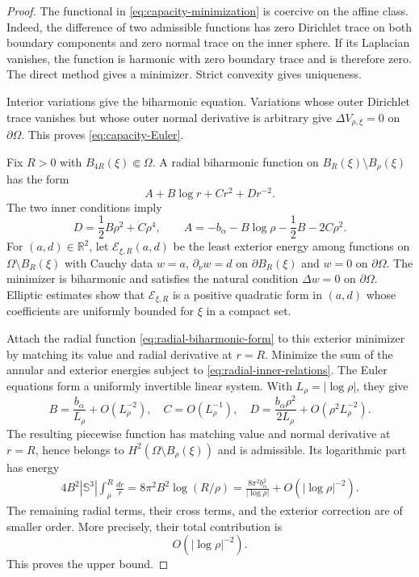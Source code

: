 \documentclass[11pt]{article}
\numberwithin{equation}{section}
\begin{document}
\begin{proof}
The functional in \eqref{eq:capacity-minimization} is coercive on
the affine class. Indeed, the difference of two admissible functions
has zero Dirichlet trace on both boundary components and zero normal
trace on the inner sphere. If its Laplacian vanishes, the function is
harmonic with zero boundary trace and is therefore zero. The direct
method gives a minimizer. Strict convexity gives uniqueness.

Interior variations give the biharmonic equation. Variations whose
outer Dirichlet trace vanishes but whose outer normal derivative is
arbitrary give $\Delta V_{\rho,\xi}=0$ on $\partial\Omega$. This proves
\eqref{eq:capacity-Euler}.

Fix $R>0$ with $B_{4R}(\xi)\Subset\Omega$. A radial biharmonic
function on $B_R(\xi)\setminus B_\rho(\xi)$ has the form
\begin{equation}\label{eq:radial-biharmonic-form}
A+B\log r+Cr^2+Dr^{-2}.
\end{equation}
The two inner conditions imply
\begin{equation}\label{eq:radial-inner-relations}
D=\frac12B\rho^2+C\rho^4,
\qquad
A=-b_\alpha-B\log\rho-\frac12B-2C\rho^2.
\end{equation}
For $(a,d)\in\mathbb R^2$, let
$\mathcal E_{\xi,R}(a,d)$ be the least exterior energy among
functions on $\Omega\setminus B_R(\xi)$ with Cauchy data
$w=a$, $\partial_\nu w=d$ on $\partial B_R(\xi)$ and
$w=0$ on $\partial\Omega$. The minimizer is biharmonic and satisfies
the natural condition $\Delta w=0$ on $\partial\Omega$.
Elliptic estimates show that
$\mathcal E_{\xi,R}$ is a positive quadratic form in $(a,d)$ whose
coefficients are uniformly bounded for $\xi$ in a compact set.

Attach the radial function \eqref{eq:radial-biharmonic-form} to this
exterior minimizer by matching its value and radial derivative at
$r=R$. Minimize the sum of the annular and exterior energies subject
to \eqref{eq:radial-inner-relations}. The Euler equations form a
uniformly invertible linear system. With
$L_\rho=|\log\rho|$, they give
\begin{equation}\label{eq:capacity-coefficients}
B=\frac{b_\alpha}{L_\rho}+O(L_\rho^{-2}),
\quad
C=O(L_\rho^{-1}),
\quad
D=\frac{b_\alpha\rho^2}{2L_\rho}
+O(\rho^2L_\rho^{-2}).
\end{equation}
The resulting piecewise function has matching value and normal
derivative at $r=R$, hence belongs to $H^2(\Omega\setminus
B_\rho(\xi))$ and is admissible. Its logarithmic
part has energy
\begin{equation}\label{eq:capacity-upper-log}
\begin{aligned}
4B^2|\mathbb S^3|\int_\rho^R\frac{dr}{r}
=8\pi^2B^2\log(R/\rho)=\frac{8\pi^2b_\alpha^2}{|\log\rho|}
+O(|\log\rho|^{-2}).
\end{aligned}
\end{equation}
The remaining radial terms, their cross terms, and the exterior
correction are of smaller order. More precisely, their total
contribution is
\begin{equation*}
O(|\log\rho|^{-2}).
\end{equation*}
This proves the upper bound.


\end{proof}
\end{document}
